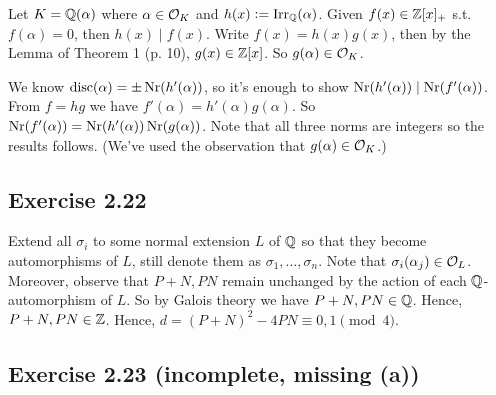 \documentclass[../Marcus.tex]{subfiles}
\begin{document}
Let $K=\mathbb{Q}(\alpha)$ where $\alpha\in\mathcal{O}_K$ and $h(x):=\operatorname{Irr}_{\mathbb{Q}}(\alpha)$. Given $f(x)\in\mathbb{Z}[x]_+$ s.t. $f(\alpha)=0$, then $h(x)\mid f(x)$. Write $f(x)=h(x)g(x)$, then by the Lemma of Theorem 1 (p. 10), $g(x)\in\mathbb{Z}[x]$. So $g(\alpha)\in\mathcal{O}_K$.

We know $\operatorname{disc}(\alpha)=\pm \operatorname{Nr}(h'(\alpha))$, so it's enough to show $\operatorname{Nr}(h'(\alpha))\mid\operatorname{Nr}(f'(\alpha))$. From $f=hg$ we have $f'(\alpha)=h'(\alpha)g(\alpha)$. So $\operatorname{Nr}(f'(\alpha))=\operatorname{Nr}(h'(\alpha))\operatorname{Nr}(g(\alpha))$. Note that all three norms are integers so the results follows. (We've used the observation that $g(\alpha)\in\mathcal{O}_K$.)

\subsection*{Exercise 2.22}

Extend all $\sigma_i$ to some normal extension $L$ of $\mathbb{Q}$ so that they become automorphisms of $L$, still denote them as $\sigma_1,\ldots,\sigma_n$. Note that $\sigma_i(\alpha_j)\in \mathcal{O}_L$. Moreover, observe that $P+N,PN$ remain unchanged by the action of each $\mathbb{Q}$-automorphism of $L$. So by Galois theory we have $P+N,PN\in\mathbb{Q}$. Hence, $P+N,PN\in\mathbb{Z}$. Hence, $d=(P+N)^2-4PN \equiv 0,1 \pmod{4}$.

\subsection*{Exercise 2.23 \color{red}(incomplete, missing (a))}
\end{document}
